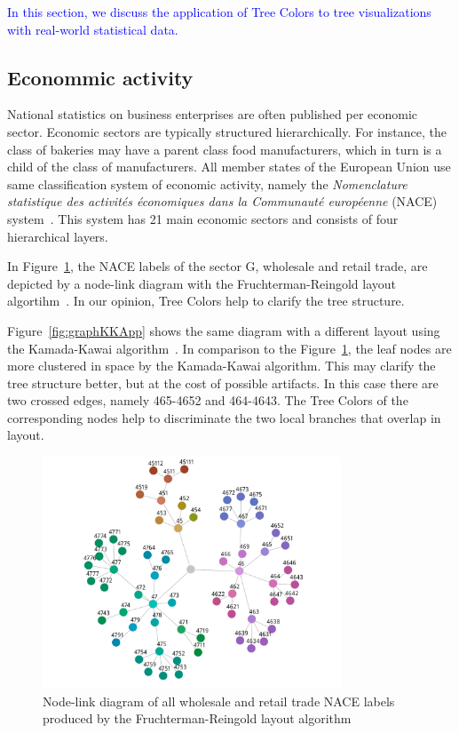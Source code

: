 \documentclass[review,journal]{vgtc}         %
\newcommand{\changedM}[1]{\textcolor{blue}{#1}}
\begin{document}
\changedM{In this section, we discuss the application of Tree Colors to tree visualizations with real-world statistical data.}

\subsection{Econommic activity}

National statistics on business enterprises are often published per economic sector. Economic sectors are typically structured hierarchically. For instance, the class of bakeries may have a parent class food manufacturers, which in turn is a child of the class of manufacturers. All member states of the European Union use same classification system of economic activity, namely the \textit{Nomenclature statistique des activit\'es \'economiques dans la Communaut\'e europ\'eenne} (NACE) system~\cite{nace}. This system has 21 main economic sectors and consists of four hierarchical layers.

In Figure~\ref{fig:graphFRApp}, the NACE labels of the sector G, wholesale and retail trade, are depicted by a node-link diagram with the Fruchterman-Reingold layout algortihm~\cite{Fruchterman91}. In our opinion, Tree Colors help to clarify the tree structure.


Figure~\ref{fig:graphKKApp} shows the same diagram with a different layout using the Kamada-Kawai algorithm~\cite{Kamada89}. In comparison to the Figure~\ref{fig:graphFRApp}, the leaf nodes are more clustered in space by the Kamada-Kawai algorithm. This may clarify the tree structure better, but at the cost of possible artifacts. In this case there are two crossed edges, namely 465-4652 and 464-4643. The Tree Colors of the corresponding nodes help to discriminate the two local branches that overlap in layout.

\begin{figure}[t]
  \centering
  \includegraphics[width=3.5in]{Gbusiness_FR.pdf}
  \caption{Node-link diagram of all wholesale and retail trade NACE labels produced by the Fruchterman-Reingold layout algorithm}\label{fig:graphFRApp}
\end{figure}
\end{document}
